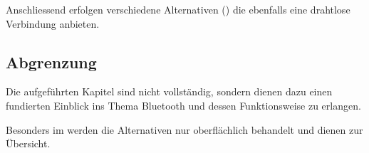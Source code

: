Anschliessend erfolgen verschiedene Alternativen () die ebenfalls eine drahtlose Verbindung anbieten.

\subsection{Abgrenzung}
Die aufgeführten Kapitel sind nicht vollständig, sondern dienen dazu einen fundierten Einblick ins Thema Bluetooth und dessen Funktionsweise zu erlangen.

Besonders im  werden die Alternativen nur oberflächlich behandelt und dienen zur Übersicht.

